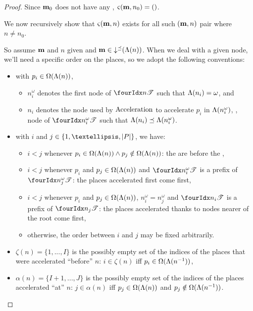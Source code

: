 \begin{proof}
  Since $\mathbf{m}_0$ does not have any \oplace, $\operatorname{\varsigma}(\mathbf{m},n_0) = ()$.

  We now recursively show that $\operatorname{\varsigma}(\mathbf{m},n)$ exists for all such $(\mathbf{m}, n)$ pair where $n \neq n_0$.

  So assume $\mathbf{m}$ and $n$ given and $\mathbf{m} \in \operatorname{\downarrow^\preceq}(\operatorname{\Lambda}(n))$.
  When we deal with a given node, we'll need a specific order on the places, so we adopt the following conventions:
  \begin{itemize}
    \item with $p_i \in \operatorname{\Omega}(\operatorname{\Lambda}(n))$,
      \begin{itemize}
        \item $n^\omega_i$ denotes the first node of $\treepath{n}$ such that $\operatorname{\Lambda}(n_i) = \omega$, and
        \item $n_i$ denotes the node used by $\operatorname{Acceleration}$ to accelerate $p_i$ in $\operatorname{\Lambda}(n^\omega_i)$, ,  node of $\treepath{n^\omega_i}$ such that $\operatorname{\Lambda}(n_i) \preceq \operatorname{\Lambda}(n^\omega_i)$.
      \end{itemize}
    \item with $i$ and $j \in \{1, …, \card{\places}\}$, we have:
      \begin{itemize}
        \item $i < j$ whenever $p_i \in \operatorname{\Omega}(\operatorname{\Lambda}(n)) \wedge p_j \notin \operatorname{\Omega}(\operatorname{\Lambda}(n))$:
          the \oplaces are before the \noplaces,
        \item $i < j$ whenever $p_i$ and $p_j \in \operatorname{\Omega}(\operatorname{\Lambda}(n))$ and $\treepath{n^\omega_i}$ is a prefix of $\treepath{n^\omega_j}$:
          the places accelerated first come first,
        \item $i < j$ whenever $p_i$ and $p_j \in \operatorname{\Omega}(\operatorname{\Lambda}(n))$, $n^\omega_i = n^\omega_j$ and $\treepath{n_i}$ is a prefix of $\treepath{n_j}$:
          the places accelerated thanks to nodes nearer of the root come first,
        \item otherwise, the order between $i$ and $j$ may be fixed arbitrarily.
      \end{itemize}
    \item $\zeta(n) = \{1, ..., I\}$ is the possibly empty set of the indices of the places that were accelerated ``before'' $n$: $i \in \zeta(n)$ iff $p_i \in \operatorname{\Omega}(\operatorname{\Lambda}(n^{-1}))$,
    \item $\alpha(n) = \{I+1, ..., J\}$ is the possibly empty set of the indices of the places accelerated ``at'' $n$: $j \in \alpha(n)$ iff $p_j \in \operatorname{\Omega}(\operatorname{\Lambda}(n))$ and $p_j \notin \operatorname{\Omega}(\operatorname{\Lambda}(n^{-1}))$.
  \end{itemize}


\end{proof}
